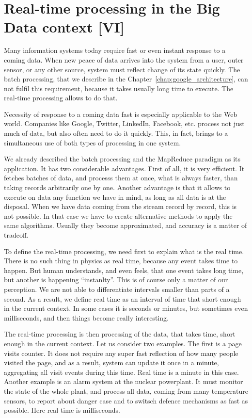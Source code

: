 \chapter{Real-time processing in the Big Data context [VI]}
\label{chap:real_time_processing}

Many information systems today require fast or even instant response to a coming data.
When new peace of data arrives into the system from a user, outer sensor, or any other source, system must reflect change of its state quickly. 
The batch processing, that we describe in the Chapter~\ref{chap:google_architecture}, can not fulfil this requirement, because it takes usually long time to execute.
The real-time processing allows to do that.

Necessity of response to a coming data fast is especially applicable to the Web world.
Companies like Google, Twitter, LinkedIn, Facebook, etc. process not just much of data, but also often need to do it quickly.
This, in fact, brings to a simultaneous use of both types of processing in one system.

We already described the batch processing and the MapReduce paradigm as its application.
It has two considerable advantages.
First of all, it is very efficient.
It fetches batches of data, and processs them at once, what is always faster, than taking records arbitrarily one by one.
Another advantage is that it allows to execute on data any function we have in mind, as long as all data is at the disposal.
When we have data coming from the stream record by record, this is not possible.
In that case we have to create alternative methods to apply the same algorithms.
Usually they become approximated, and accuracy is a matter of tradeoff.

To define the real-time processing, we need first to explain what is the real time.
There is no such thing in physics as real time, because any event takes time to happen.
But human understands, and even feels, that one event takes long time, but another is happening ``instanlty''.
This is of course only a matter of our perception.
We are not able to differentiate intervals smaller than parts of a second.
As a result, we define real time as an interval of time that short enough in the current context.
In some cases it is seconds or minutes, but sometimes even milliseconds, and then things become really interesting.

The real-time processing is then processing of the data, that takes time, short enough in the current context.
Let us consider two examples.
The first is a page visits counter.
It does not require any super fast reflection of how many people visited the page, and as a result, system can update it once in a minute, aggregating all visit events during this time.
Real time is a minute in this case.
Another example is an alarm system at the nuclear powerplant.
It must monitor the state of the whole plant, and process all data, coming from many temperature sensors, to report about danger case and to switsch defence mechanisms as fast as possible.
Here real time is milliseconds.

